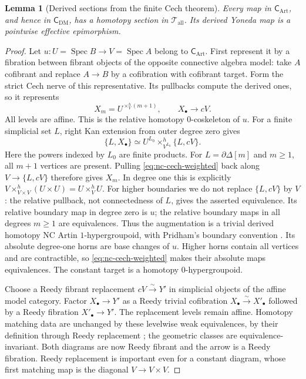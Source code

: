 \documentclass[12pt]{amsart}
\newtheorem{lem}[thm]{Lemma}
\theoremstyle{definition}
\theoremstyle{remark}
\numberwithin{equation}{section}
\DeclareMathOperator{\Spec}{Spec}
\begin{document}
\begin{lem}[Derived sections from the finite Cech theorem]
\label{lem:nc-geometric-sections}
Every map in $\mathsf C_{\mathrm{Art}}$, and hence in
$\mathsf C_{\mathrm{DM}}$, has a homotopy section in
$\mathcal T_{\mathrm{all}}$. Its derived Yoneda map is a pointwise
effective epimorphism.
\end{lem}

\begin{proof}
Let $u:U=\Spec B\to V=\Spec A$ belong to
$\mathsf C_{\mathrm{Art}}$. First represent it by a fibration
between fibrant objects of the opposite connective algebra model:
take $A$ cofibrant and replace $A\to B$ by a cofibration with
cofibrant target. Form the strict Cech nerve of this
representative. Its pullbacks compute the derived ones, so it
represents
\[
 X_m=U^{\times^h_V(m+1)},\qquad X_\bullet\longrightarrow cV.
\]
All levels are affine. This is the relative homotopy
$0$-coskeleton of $u$. For a finite simplicial set $L$, right Kan
extension from outer degree zero gives
\begin{equation}\label{eq:nc-cech-weighted}
 \{L,X_\bullet\}\simeq
 U^{L_0}\times^h_{V^{L_0}}\{L,cV\}.
\end{equation}
Here the powers indexed by $L_0$ are finite products. For
$L=\partial\Delta[m]$ and $m\ge1$, all $m+1$ vertices are present.
Pulling \eqref{eq:nc-cech-weighted} back along $V\to\{L,cV\}$
therefore gives $X_m$. In degree one this is explicitly
$V\times^h_{V\times V}(U\times U)=U\times^h_V U$. For higher
boundaries we do not replace $\{L,cV\}$ by $V$: the relative
pullback, not connectedness of $L$, gives the asserted
equivalence. Its relative boundary map in degree zero is $u$; the
relative boundary maps in all degrees $m\ge1$ are equivalences.
Thus the augmentation is a trivial derived homotopy NC Artin
$1$-hypergroupoid, with Pridham's boundary convention
\cite[Definitions~3.1--3.2, p.~16]{Pridham2013}. Its absolute
degree-one horns are base changes of $u$. Higher horns contain all
vertices and are contractible, so \eqref{eq:nc-cech-weighted}
makes their absolute maps equivalences. The constant target is a
homotopy $0$-hypergroupoid.

Choose a Reedy fibrant replacement $cV\overset{\sim}{\to}Y'$ in
simplicial objects of the affine model category. Factor
$X_\bullet\to Y'$ as a Reedy trivial cofibration
$X_\bullet\overset{\sim}{\to}X'_\bullet$ followed by a Reedy
fibration $X'_\bullet\to Y'$. The replacement levels remain
affine. Homotopy matching data are unchanged by these levelwise
weak equivalences, by their definition through Reedy replacement
\cite[Definition~2.30, p.~23]{PridhamNC2023}; the geometric classes
are equivalence-invariant. Both diagrams are now Reedy fibrant and
the arrow is a Reedy fibration. Reedy replacement is important
even for a constant diagram, whose first matching map is the diagonal
$V\to V\times V$.


\end{proof}
\end{document}
